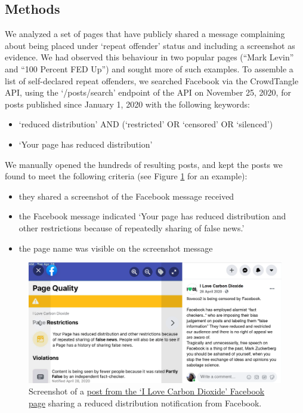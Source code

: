 \documentclass[11pt,a4paper]{article}
\begin{document}
\subsection{Methods}

We analyzed a set of pages that have publicly shared a message complaining about being placed under ‘repeat offender’ status and including a screenshot as evidence. 
We had observed this behaviour in two popular pages (“Mark Levin” and “100 Percent FED Up”) and sought more of such examples. 
To assemble a list of self-declared repeat offenders, we searched Facebook via the CrowdTangle API, using the `/posts/search' endpoint of the API on November 25, 2020, for posts published since January 1, 2020 with the following keywords:
\begin{itemize}
\item `reduced distribution' AND (`restricted' OR `censored' OR `silenced')
\item `Your page has reduced distribution'
\end{itemize}

We manually opened the hundreds of resulting posts, and kept the posts we found to meet the following criteria (see Figure \ref{reduce_example_screenshot} for an example):
\begin{itemize}
\item they shared a screenshot of the Facebook message received
\item the Facebook message indicated `Your page has reduced distribution and other restrictions because of repeatedly sharing of false news.'
\item the page name was visible on the screenshot message
\end{itemize}

\begin{figure}[!h]
\centering
\includegraphics[width=\linewidth]{./../figure/reduce_example_screenshot.png}
\caption{Screenshot of a \href{https://www.facebook.com/64162630683/posts/10156872415530684}{post from the `I Love Carbon Dioxide' Facebook page} sharing a reduced distribution notification from Facebook.}
\label{reduce_example_screenshot}
\end{figure}
\end{document}
